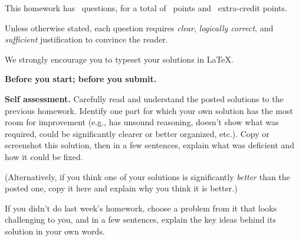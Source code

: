 \documentclass[11pt,addpoints,answers]{exam}
\theoremstyle{plain}            %
\theoremstyle{definition}       %
\theoremstyle{remark}           %
\newcommand{\hwpreface}{

\noindent This homework has \numquestions\ questions, for a total of \numpoints\ points and \numbonuspoints\ extra-credit points.

\noindent Unless otherwise stated, each question requires \emph{clear}, \emph{logically correct}, and \emph{sufficient} justification to convince the reader.

\noindent We strongly encourage you to typeset your solutions in \LaTeX.

}
\begin{document}

\hwpreface


\begin{questions}

  \addtocounter{question}{-1}
  \question[0] \textbf{Before you start; before you submit.} \nopagebreak


  \question[10] \textbf{Self assessment.} \nopagebreak
  Carefully read and understand the posted solutions to the previous homework.
  Identify one part for which your own solution has the most room for improvement (e.g., has unsound reasoning, doesn’t show what was required, could be significantly clearer or better organized, etc.).
  Copy or screenshot this solution, then in a few sentences, explain what was deficient and how it could be fixed.

  (Alternatively, if you think one of your solutions is significantly \emph{better} than the posted one, copy it here and explain why you think it is better.)

  If you didn't do last week's homework, choose a problem from it that looks challenging to you, and in a few sentences, explain the key ideas behind its solution in your own words.


\end{questions}
\end{document}
